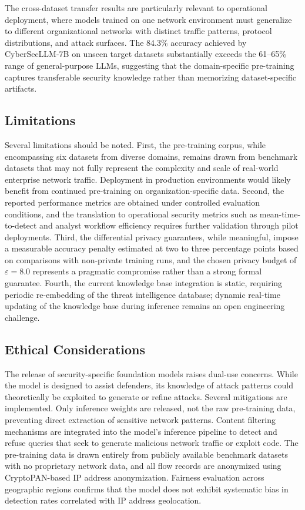 \documentclass[journal]{IEEEtran}
\newcommand{\modelname}{CyberSecLLM}
\begin{document}
The cross-dataset transfer results are particularly relevant to operational deployment, where models trained on one network environment must generalize to different organizational networks with distinct traffic patterns, protocol distributions, and attack surfaces. The 84.3\% accuracy achieved by \modelname{}-7B on unseen target datasets substantially exceeds the 61--65\% range of general-purpose LLMs, suggesting that the domain-specific pre-training captures transferable security knowledge rather than memorizing dataset-specific artifacts.

\subsection{Limitations}
\label{subsec:limitations}

Several limitations should be noted. First, the pre-training corpus, while encompassing six datasets from diverse domains, remains drawn from benchmark datasets that may not fully represent the complexity and scale of real-world enterprise network traffic. Deployment in production environments would likely benefit from continued pre-training on organization-specific data. Second, the reported performance metrics are obtained under controlled evaluation conditions, and the translation to operational security metrics such as mean-time-to-detect and analyst workflow efficiency requires further validation through pilot deployments. Third, the differential privacy guarantees, while meaningful, impose a measurable accuracy penalty estimated at two to three percentage points based on comparisons with non-private training runs, and the chosen privacy budget of $\varepsilon = 8.0$ represents a pragmatic compromise rather than a strong formal guarantee. Fourth, the current knowledge base integration is static, requiring periodic re-embedding of the threat intelligence database; dynamic real-time updating of the knowledge base during inference remains an open engineering challenge.

\subsection{Ethical Considerations}
\label{subsec:ethics}

The release of security-specific foundation models raises dual-use concerns. While the model is designed to assist defenders, its knowledge of attack patterns could theoretically be exploited to generate or refine attacks. Several mitigations are implemented. Only inference weights are released, not the raw pre-training data, preventing direct extraction of sensitive network patterns. Content filtering mechanisms are integrated into the model's inference pipeline to detect and refuse queries that seek to generate malicious network traffic or exploit code. The pre-training data is drawn entirely from publicly available benchmark datasets with no proprietary network data, and all flow records are anonymized using CryptoPAN-based IP address anonymization. Fairness evaluation across geographic regions confirms that the model does not exhibit systematic bias in detection rates correlated with IP address geolocation.
\end{document}
